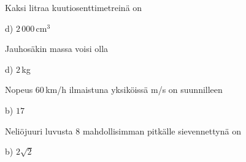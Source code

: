 \begin{multicols}{2}
\begin{tehtava}
Kaksi litraa kuutiosenttimetreinä on	
	\begin{vastaus}
	d) $2\,000$\,cm$^3$
	\end{vastaus}
\end{tehtava}

\begin{tehtava}
Jauhosäkin massa voisi olla
	\begin{vastaus}
	d) $2$\,kg
	\end{vastaus}
\end{tehtava}

\begin{tehtava}
Nopeus $60$\,km/h ilmaistuna yksiköissä m/s on suunnilleen
	\begin{vastaus}
	b) $17$
	\end{vastaus}
\end{tehtava}

\begin{tehtava}
Neliöjuuri luvusta $8$ mahdollisimman pitkälle sievennettynä on
  \begin{vastaus}
	 b) $2\sqrt{2}$
    \end{vastaus}
\end{tehtava}
\end{multicols}

